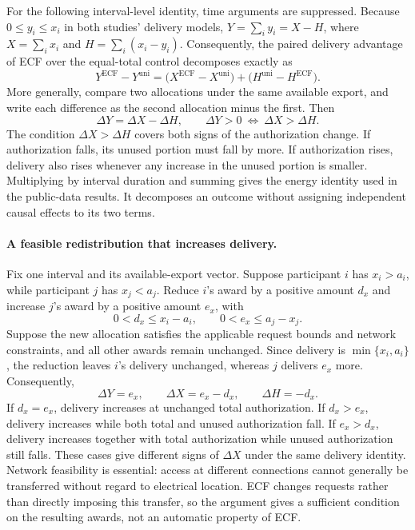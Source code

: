 \documentclass[11pt]{article}
\begin{document}
For the following interval-level identity, time arguments are suppressed.
Because $0\le y_i\le x_i$ in both studies' delivery models,
$Y=\sum_i y_i=X-H$, where $X=\sum_i x_i$ and
$H=\sum_i(x_i-y_i)$. Consequently, the paired delivery advantage of ECF over
the equal-total control decomposes exactly as
\begin{equation}
Y^{\mathrm{ECF}}-Y^{\mathrm{uni}}
=
\bigl(X^{\mathrm{ECF}}-X^{\mathrm{uni}}\bigr)
+
\bigl(H^{\mathrm{uni}}-H^{\mathrm{ECF}}\bigr).
\label{eq:supp_delivery_advantage_decomposition}
\end{equation}
More generally, compare two allocations under the same available export, and
write each difference as the second allocation minus the first. Then
\begin{equation}
\Delta Y=\Delta X-\Delta H,
\qquad \Delta Y>0\ \Longleftrightarrow\ \Delta X>\Delta H.
\label{eq:supp_delivery_gain_condition}
\end{equation}
The condition $\Delta X>\Delta H$ covers both signs of the authorization
change. If authorization falls, its unused portion must fall by more. If
authorization rises, delivery also rises whenever any increase in the unused
portion is smaller. Multiplying by interval duration and summing gives the
energy identity used in the public-data results. It decomposes an outcome
without assigning independent causal effects to its two terms.

\paragraph{A feasible redistribution that increases delivery.}
Fix one interval and its available-export vector. Suppose participant $i$ has
$x_i>a_i$, while participant $j$ has $x_j<a_j$. Reduce $i$'s award by a positive
amount $d_x$ and increase $j$'s award by a positive amount $e_x$, with
\begin{equation}
0<d_x\le x_i-a_i,\qquad 0<e_x\le a_j-x_j.
\label{eq:supp_transfer_conditions}
\end{equation}
Suppose the new allocation satisfies the applicable request bounds and network constraints,
and all other awards remain unchanged. Since delivery is $\min\{x_i,a_i\}$,
the reduction leaves $i$'s delivery unchanged, whereas $j$ delivers $e_x$ more.
Consequently,
\begin{equation}
\Delta Y=e_x,\qquad \Delta X=e_x-d_x,\qquad \Delta H=-d_x.
\label{eq:supp_feasible_delivery_transfer}
\end{equation}
If $d_x=e_x$, delivery increases at unchanged total authorization. If $d_x>e_x$,
delivery increases while both total and unused authorization fall. If $e_x>d_x$,
delivery increases together with total authorization while unused authorization
still falls. These cases give different signs of $\Delta X$ under the same
delivery identity. Network
feasibility is essential: access at different connections cannot generally be
transferred without regard to electrical location. ECF changes requests rather
than directly imposing this transfer, so the argument gives a sufficient
condition on the resulting awards, not an automatic property of ECF.
\end{document}
